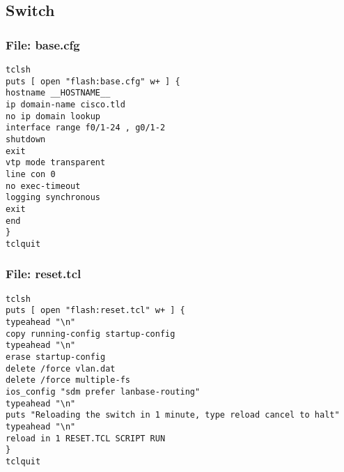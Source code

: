 \documentclass{article}
\begin{document}

\subsection{Switch}

\subsubsection{File: base.cfg}

\begin{verbatim}
tclsh
puts [ open "flash:base.cfg" w+ ] {
hostname __HOSTNAME__
ip domain-name cisco.tld
no ip domain lookup
interface range f0/1-24 , g0/1-2
shutdown
exit
vtp mode transparent
line con 0
no exec-timeout
logging synchronous
exit
end
}
tclquit
\end{verbatim}

\subsubsection{File: reset.tcl}

\begin{verbatim}
tclsh
puts [ open "flash:reset.tcl" w+ ] {
typeahead "\n"
copy running-config startup-config
typeahead "\n"
erase startup-config
delete /force vlan.dat
delete /force multiple-fs
ios_config "sdm prefer lanbase-routing"
typeahead "\n"
puts "Reloading the switch in 1 minute, type reload cancel to halt"
typeahead "\n"
reload in 1 RESET.TCL SCRIPT RUN
}
tclquit
\end{verbatim}

%
%




%
%
\end{document}
